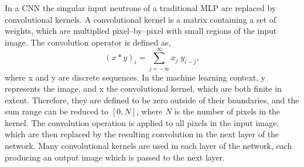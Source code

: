 In a CNN the singular input neutrons of a traditional MLP are replaced by
convolutional kernels. A convolutional kernel is a matrix containing a set of 
weights, which are multiplied pixel--by--pixel with small regions of the input 
image. The convolution operator is defined as, 
\begin{equation*}
	\left( x * y \right)_i = \sum_{j = - \infty}^{\infty} x_j \; y_{i-j},
\end{equation*}
where x and y are discrete sequences. In the machine learning context, y
represents the image, and x the convolutional kernel, which are both finite in
extent. Therefore, they are defined to be zero outside of their boundaries, and
the sum range can be reduced to $\left[0, N\right]$, where $N$ is the number 
of pixels in the kernel. The convolution operation is applied to all pixels in 
the input image, which are then replaced by the resulting convolution in the 
next layer of the network. Many convolutional kernels are used in each layer 
of the network, each producing an output image which is passed to the next 
layer. 

